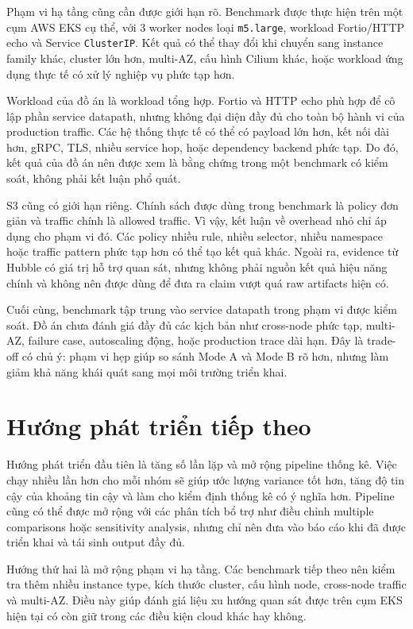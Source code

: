 Phạm vi hạ tầng cũng cần được giới hạn rõ. Benchmark được thực hiện trên một cụm AWS EKS cụ thể, với 3 worker nodes loại \texttt{m5.large}, workload Fortio/HTTP echo và Service \texttt{ClusterIP}. Kết quả có thể thay đổi khi chuyển sang instance family khác, cluster lớn hơn, multi-AZ, cấu hình Cilium khác, hoặc workload ứng dụng thực tế có xử lý nghiệp vụ phức tạp hơn.

Workload của đồ án là workload tổng hợp. Fortio và HTTP echo phù hợp để cô lập phần service datapath, nhưng không đại diện đầy đủ cho toàn bộ hành vi của production traffic. Các hệ thống thực tế có thể có payload lớn hơn, kết nối dài hơn, gRPC, TLS, nhiều service hop, hoặc dependency backend phức tạp. Do đó, kết quả của đồ án nên được xem là bằng chứng trong một benchmark có kiểm soát, không phải kết luận phổ quát.

S3 cũng có giới hạn riêng. Chính sách được dùng trong benchmark là policy đơn giản và traffic chính là allowed traffic. Vì vậy, kết luận về overhead nhỏ chỉ áp dụng cho phạm vi đó. Các policy nhiều rule, nhiều selector, nhiều namespace hoặc traffic pattern phức tạp hơn có thể tạo kết quả khác. Ngoài ra, evidence từ Hubble có giá trị hỗ trợ quan sát, nhưng không phải nguồn kết quả hiệu năng chính và không nên được dùng để đưa ra claim vượt quá raw artifacts hiện có.

Cuối cùng, benchmark tập trung vào service datapath trong phạm vi được kiểm soát. Đồ án chưa đánh giá đầy đủ các kịch bản như cross-node phức tạp, multi-AZ, failure case, autoscaling động, hoặc production trace dài hạn. Đây là trade-off có chủ ý: phạm vi hẹp giúp so sánh Mode A và Mode B rõ hơn, nhưng làm giảm khả năng khái quát sang mọi môi trường triển khai.

\section{Hướng phát triển tiếp theo}

Hướng phát triển đầu tiên là tăng số lần lặp và mở rộng pipeline thống kê. Việc chạy nhiều lần hơn cho mỗi nhóm sẽ giúp ước lượng variance tốt hơn, tăng độ tin cậy của khoảng tin cậy và làm cho kiểm định thống kê có ý nghĩa hơn. Pipeline cũng có thể được mở rộng với các phân tích bổ trợ như điều chỉnh multiple comparisons hoặc sensitivity analysis, nhưng chỉ nên đưa vào báo cáo khi đã được triển khai và tái sinh output đầy đủ.

Hướng thứ hai là mở rộng phạm vi hạ tầng. Các benchmark tiếp theo nên kiểm tra thêm nhiều instance type, kích thước cluster, cấu hình node, cross-node traffic và multi-AZ. Điều này giúp đánh giá liệu xu hướng quan sát được trên cụm EKS hiện tại có còn giữ trong các điều kiện cloud khác hay không.

